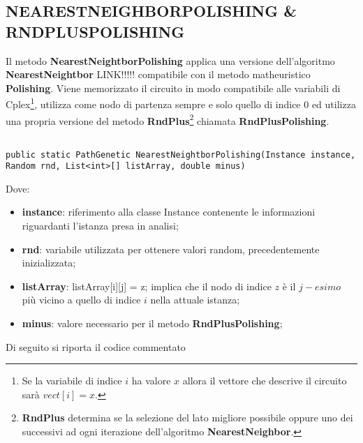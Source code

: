 \documentclass[11pt]{article}
\begin{document}
\subsection*{NEARESTNEIGHBORPOLISHING \& RNDPLUSPOLISHING}
\label{sec:NNPRNDPS}

Il metodo \textbf{NearestNeightborPolishing} applica una versione dell'algoritmo \textbf{NearestNeightbor} LINK!!!!! compatibile con il metodo matheuristico \textbf{Polishing}.
Viene memorizzato il circuito in modo compatibile alle variabili di Cplex\footnote{Se la variabile di indice $i$ ha valore $x$ allora il vettore che descrive il circuito sarà $vect[i] = x$.}, utilizza come nodo di partenza sempre e solo quello di indice $0$ ed utilizza una propria versione del metodo \textbf{RndPlus}\footnote{\textbf{RndPlus} determina se la selezione del lato migliore possibile oppure uno dei successivi ad ogni iterazione dell'algoritmo \textbf{NearestNeighbor}.} chiamata \textbf{RndPlusPolishing}.

\begin{lstlisting}

public static PathGenetic NearestNeightborPolishing(Instance instance, Random rnd, List<int>[] listArray, double minus)

\end{lstlisting}

Dove:

\begin{itemize}
    \item \textbf{instance}: riferimento alla classe Instance contenente le informazioni riguardanti l'istanza presa in analisi;
    \item \textbf{rnd}: variabile utilizzata per ottenere valori random, precedentemente inizializzata;
    \item \textbf{listArray}: listArray[i][j] = z; implica che il nodo di indice $z$ è il $j-esimo$ più vicino a quello di indice $i$ nella attuale istanza;
    \item \textbf{minus}: valore necessario per il metodo \textbf{RndPlusPolishing};
\end{itemize}

Di seguito si riporta il codice commentato
\end{document}
